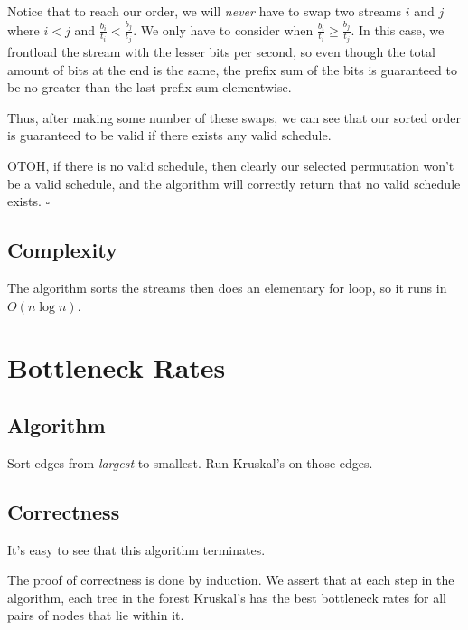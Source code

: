 \documentclass[12pt]{article}
\begin{document}
Notice that to reach our order, we will \textit{never} have to swap
two streams $i$ and $j$ where $i < j$ and $\frac{b_i}{t_i} < \frac{b_j}{t_j}$.
We only have to consider when $\frac{b_i}{t_i} \ge \frac{b_j}{t_j}$.
In this case, we frontload the stream with the lesser bits per second,
so even though the total amount of bits at the end is the same, the
prefix sum of the bits is guaranteed to be no greater than the last
prefix sum elementwise.

Thus, after making some number of these swaps, we can see that
our sorted order is guaranteed to be valid if there exists any valid schedule.

OTOH, if there is no valid schedule, then clearly
our selected permutation won't be a valid schedule, and the algorithm
will correctly return that no valid schedule exists. $\square$

\subsection{Complexity}

The algorithm sorts the streams then does an elementary for loop, so it runs in $\boxed{O(n \log n)}$.

\pagebreak

\section{Bottleneck Rates}

\subsection{Algorithm}

\begin{algorithmic}[1]
    \State Sort edges from \textit{largest} to smallest.
    \State Run Kruskal's on those edges.
\end{algorithmic}

\subsection{Correctness}

It's easy to see that this algorithm terminates.

The proof of correctness is done by induction.
We assert that at each step in the algorithm, each tree in the forest
Kruskal's has the best bottleneck rates for all pairs of nodes that
lie within it.
\end{document}
